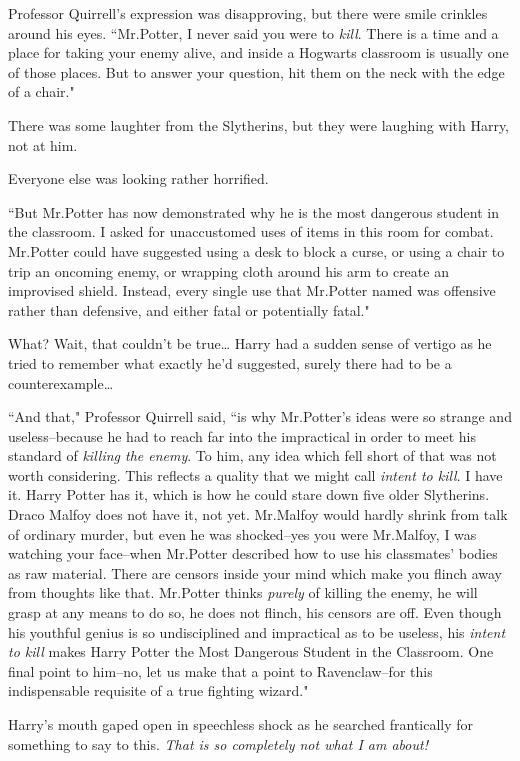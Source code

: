 Professor Quirrell's expression was disapproving, but there were smile crinkles around his eyes. ``Mr.\?Potter, I never said you were to \emph{kill}. There is a time and a place for taking your enemy alive, and inside a Hogwarts classroom is usually one of those places. But to answer your question, hit them on the neck with the edge of a chair."

There was some laughter from the Slytherins, but they were laughing with Harry, not at him.

Everyone else was looking rather horrified.

``But Mr.\?Potter has now demonstrated why he is the most dangerous student in the classroom. I asked for unaccustomed uses of items in this room for combat. Mr.\?Potter could have suggested using a desk to block a curse, or using a chair to trip an oncoming enemy, or wrapping cloth around his arm to create an improvised shield. Instead, every single use that Mr.\?Potter named was offensive rather than defensive, and either fatal or potentially fatal."

What? Wait, that couldn't be true{\ldots} Harry had a sudden sense of vertigo as he tried to remember what exactly he'd suggested, surely there had to be a counterexample{\ldots}

``And that," Professor Quirrell said, ``is why Mr.\?Potter's ideas were so strange and useless\---because he had to reach far into the impractical in order to meet his standard of \emph{killing the enemy}. To him, any idea which fell short of that was not worth considering. This reflects a quality that we might call \emph{intent to kill}. I have it. Harry Potter has it, which is how he could stare down five older Slytherins. Draco Malfoy does not have it, not yet. Mr.\?Malfoy would hardly shrink from talk of ordinary murder, but even he was shocked\---yes you were Mr.\?Malfoy, I was watching your face\---when Mr.\?Potter described how to use his classmates' bodies as raw material. There are censors inside your mind which make you flinch away from thoughts like that. Mr.\?Potter thinks \emph{purely} of killing the enemy, he will grasp at any means to do so, he does not flinch, his censors are off. Even though his youthful genius is so undisciplined and impractical as to be useless, his \emph{intent to kill} makes Harry Potter the Most Dangerous Student in the Classroom. One final point to him\---no, let us make that a point to Ravenclaw\---for this indispensable requisite of a true fighting wizard."

Harry's mouth gaped open in speechless shock as he searched frantically for something to say to this. \emph{That is so completely not what I am about!}

